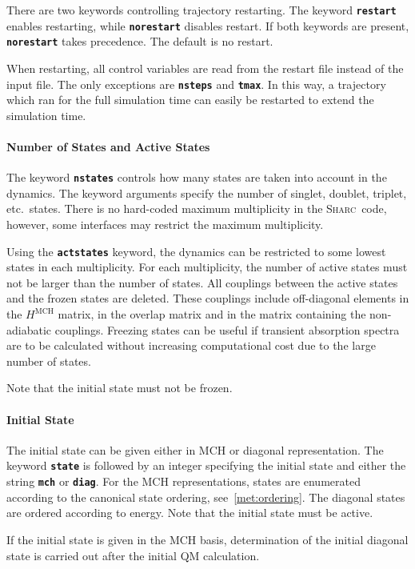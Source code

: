 \documentclass[a4paper,11pt,DIV=15,openany,twoside=false]{scrbook}
\newcommand{\sharc}{\textsc{Sharc}}
\newcommand{\ttt}[1]{\textbf{\texttt{#1}}}
\begin{document}
There are two keywords controlling trajectory restarting. The keyword \ttt{restart} enables restarting, while \ttt{norestart} disables restart. If both keywords are present, \ttt{norestart} takes precedence. The default is no restart.

When restarting, all control variables are read from the restart file instead of the input file. The only exceptions are \ttt{nsteps} and \ttt{tmax}. In this way, a trajectory which ran for the full simulation time can easily be restarted to extend the simulation time.

\paragraph{Number of States and Active States}

The keyword \ttt{nstates} controls how many states are taken into account in the dynamics. The keyword arguments specify the number of singlet, doublet, triplet, etc.\ states. There is no hard-coded maximum multiplicity in the \sharc\ code, however, some interfaces may restrict the maximum multiplicity. 

Using the \ttt{actstates} keyword, the dynamics can be restricted to some lowest states in each multiplicity. For each multiplicity, the number of active states must not be larger than the number of states. All couplings between the active states and the frozen states are deleted. These couplings include off-diagonal elements in the $H^{\text{MCH}}$ matrix, in the overlap matrix and in the matrix containing the non-adiabatic couplings. Freezing states can be useful if transient absorption spectra are to be calculated without increasing computational cost due to the large number of states.

Note that the initial state must not be frozen.

\paragraph{Initial State}

The initial state can be given either in MCH or diagonal representation. The keyword \ttt{state} is followed by an integer specifying the initial state and either the string \ttt{mch} or \ttt{diag}. For the MCH representations, states are enumerated according to the canonical state ordering, see~\ref{met:ordering}. The diagonal states are ordered according to energy. Note that the initial state must be active. 

If the initial state is given in the MCH basis, determination of the initial diagonal state is carried out after the initial QM calculation.
\end{document}
